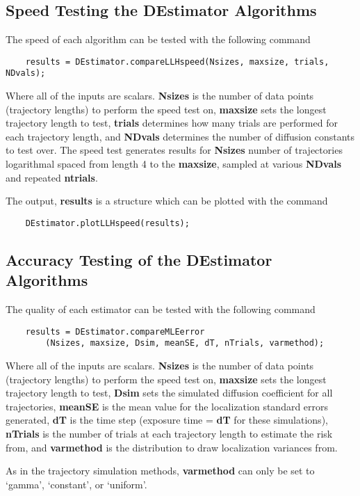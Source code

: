 \documentclass{article}
\begin{document}
\subsection{Speed Testing the DEstimator Algorithms}
The speed of each algorithm can be tested with the following command
\begin{verbatim}
    results = DEstimator.compareLLHspeed(Nsizes, maxsize, trials, NDvals);
\end{verbatim}
Where all of the inputs are scalars.  \textbf{Nsizes} is the number of data points (trajectory lengths) to perform the speed test on, \textbf{maxsize} sets the longest trajectory length to test, \textbf{trials} determines how many trials are performed for each trajectory length, and \textbf{NDvals} determines the number of diffusion constants to test over.  The speed test generates results for \textbf{Nsizes} number of trajectories logarithmal spaced from length 4 to the \textbf{maxsize}, sampled at various \textbf{NDvals} and repeated \textbf{ntrials}.

The output, \textbf{results} is a structure which can be plotted with the command
\begin{verbatim}
    DEstimator.plotLLHspeed(results);
\end{verbatim}

\subsection{Accuracy Testing of the DEstimator Algorithms}
The quality of each estimator can be tested with the following command
\begin{verbatim}
    results = DEstimator.compareMLEerror
        (Nsizes, maxsize, Dsim, meanSE, dT, nTrials, varmethod);
\end{verbatim}
Where all of the inputs are scalars.  \textbf{Nsizes} is the number of data points (trajectory lengths) to perform the speed test on, \textbf{maxsize} sets the longest trajectory length to test, \textbf{Dsim} sets the simulated diffusion coefficient for all trajectories, \textbf{meanSE} is the mean value for the localization standard errors generated, \textbf{dT} is the time step (exposure time = \textbf{dT} for these simulations), \textbf{nTrials} is the number of trials at each trajectory length to estimate the risk from, and \textbf{varmethod} is the distribution to draw localization variances from.

As in the trajectory simulation methods, \textbf{varmethod} can only be set to `gamma', `constant', or `uniform'.
\end{document}
